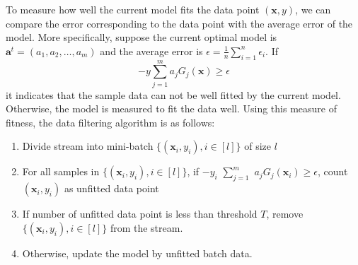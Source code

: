 \documentclass[letterpaper]{article}
\begin{document}
To measure how well the current model fits the data point $(\mathbf{x}, y)$, we can compare the error corresponding to the data point with the average error of the model. More specifically, suppose the current optimal model is $\mathbf{a}^t = (a_1, a_2, \ldots, a_m)$ and the average error is $\epsilon = \frac{1}{n}\sum_{i=1}^n\epsilon_i$. If
\begin{equation}
 -y\sum_{j=1}^m a_jG_j(\mathbf{x}) \geq \epsilon
\end{equation}
it indicates that the sample data can not be well fitted by the current model. Otherwise, the model is measured to fit the data well. Using this measure of fitness, the data filtering algorithm is as follows:
\begin{enumerate}
\item Divide stream into mini-batch $\{(\mathbf{x}_i, y_i), i \in [l]\}$ of size $l$
\item For all samples in $\{(\mathbf{x}_i, y_i), i \in [l]\}$, if $-y_i$ $\sum_{j=1}^m$ $a_jG_j(\mathbf{x}_i)$$\geq \epsilon $, count $(\mathbf{x}_i, y_i)$ as unfitted data point
\item If number of unfitted data point is less than threshold $T$, remove $\{(\mathbf{x}_i, y_i), i \in [l]\}$ from the stream.
\item Otherwise, update the  model by unfitted batch data.
\end{enumerate}

\end{document}
